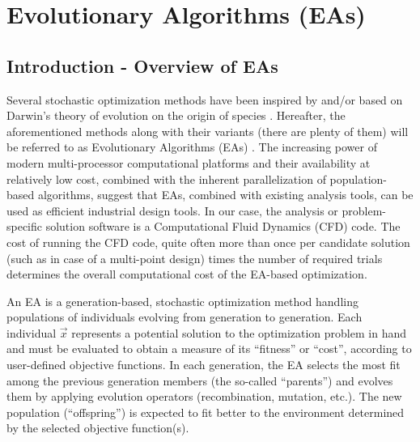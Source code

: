 \chapter{Evolutionary Algorithms (EAs)} %


\ifpdf
    \graphicspath{{2/figures/PNG/}{2/figures/PDF/}{2/figures/}}
\else
    \graphicspath{{2/figures/EPS/}{2/figures/}}
\fi


\section{Introduction - Overview of EAs}
\label{EAintro}
Several stochastic optimization methods have been inspired by and/or based on Darwin's theory of evolution on the origin of species \cite{Darwin}. Hereafter, the aforementioned methods along with their variants (there are plenty of them) will be referred to as Evolutionary Algorithms (EAs) \cite{HowToSolveIt}. The increasing power of modern multi-processor computational platforms and their availability at relatively low cost, combined with the inherent parallelization of population-based algorithms, suggest that EAs, combined with existing analysis tools, can be used as efficient industrial design tools. In our case, the analysis or problem-specific solution software is a Computational Fluid Dynamics (CFD) code. The cost of running the CFD code, quite often more than once per candidate solution (such as in case of a multi-point design) times the number of required trials determines the overall computational cost of the EA-based optimization.      

An EA is a generation-based, stochastic optimization method handling populations of individuals evolving from generation to generation. Each individual $\vec{x}$ represents a potential solution to the optimization problem in hand and must be evaluated to obtain a measure of its ``fitness'' or ``cost'', according to user-defined objective functions. In each generation, the EA selects the most fit among the previous generation members (the so-called ``parents'') and evolves them by applying evolution operators (recombination, mutation, etc.). The new population (``offspring'') is expected to fit better to the environment determined by the selected objective function(s).     

